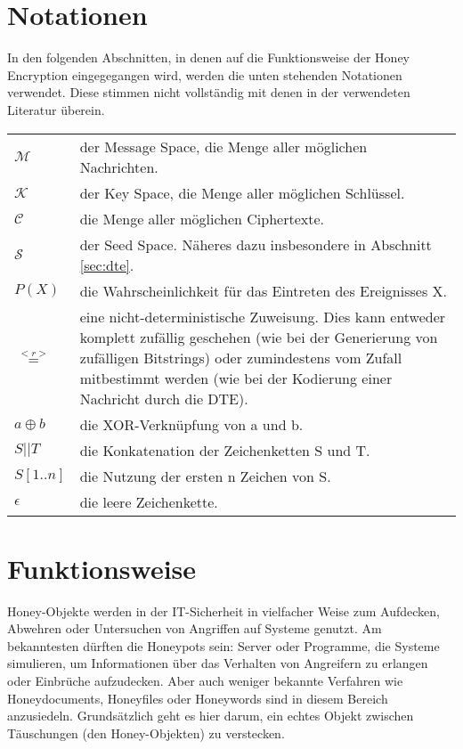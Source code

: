 \section{Notationen}

In den folgenden Abschnitten, in denen auf die Funktionsweise der Honey Encryption eingegegangen wird, werden die unten stehenden Notationen verwendet. Diese stimmen nicht vollständig mit denen in der verwendeten Literatur überein.

\begin{tabular}{lp{14cm}}
\(\mathcal{M}\) & der Message Space, die Menge aller möglichen Nachrichten. \\ 
\(\mathcal{K}\) & der Key Space, die Menge aller möglichen Schlüssel. \\ 
\(\mathcal{C}\) & die Menge aller möglichen Ciphertexte. \\ 
\(\mathcal{S}\) & der Seed Space. Näheres dazu insbesondere in Abschnitt \ref{sec:dte}. \\ 
\(P(X)\) & die Wahrscheinlichkeit für das Eintreten des Ereignisses X.\\ 
\(\overset{<r>}{=}\) & eine nicht-deterministische Zuweisung. Dies kann entweder komplett zufällig geschehen (wie bei der Generierung von zufälligen Bitstrings) oder zumindestens vom Zufall mitbestimmt werden (wie bei der Kodierung einer Nachricht durch die DTE). \\ 
\(a \oplus b\) & die XOR-Verknüpfung von a und b. \\ 
\(S || T\) & die Konkatenation der Zeichenketten S und T. \\ 
\(S{[1..n]}\) & die Nutzung der ersten n Zeichen von S. \\ 
\(\epsilon\) & die leere Zeichenkette. \\ 
\end{tabular}

\newpage

\section{Funktionsweise}
\label{sec:funktionsweise}

Honey-Objekte werden in der IT-Sicherheit in vielfacher Weise zum Aufdecken, Abwehren oder Untersuchen von Angriffen auf Systeme genutzt. Am bekanntesten dürften die Honeypots sein: Server oder Programme, die Systeme simulieren, um Informationen über das Verhalten von Angreifern zu erlangen oder Einbrüche aufzudecken. Aber auch weniger bekannte Verfahren wie Honeydocuments, Honeyfiles oder Honeywords sind in diesem Bereich anzusiedeln. Grundsätzlich geht es hier darum, ein echtes Objekt zwischen Täuschungen (den Honey-Objekten) zu verstecken. 

